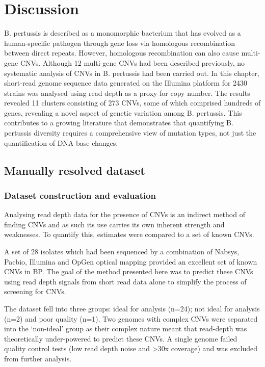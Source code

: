 \documentclass{article}
\begin{document}
\section{Discussion}

B. pertussis is described as a monomorphic bacterium that has evolved as a human-specific pathogen through gene loss via homologous recombination between direct repeats. However, homologous recombination can also cause multi-gene CNVs. Although 12 multi-gene CNVs had been described previously, no systematic analysis of CNVs in B. pertussis had been carried out. In this chapter, short-read genome sequence data generated on the Illumina platform for 2430 strains was analysed using read depth as a proxy for copy number.  The results revealed 11 clusters consisting of 273 CNVs, some of which comprised hundreds of genes, revealing a novel aspect of genetic variation among B. pertussis. This contributes to a growing literature that demonstrates that quantifying B. pertussis diversity requires a comprehensive view of mutation types, not just the quantification of DNA base changes.


\subsection{Manually resolved dataset}

\subsubsection{Dataset construction and evaluation}
Analysing read depth data for the presence of CNVs is an indirect method of finding CNVs and as such its use carries its own inherent strength and weaknesses. To quantify this, estimates were compared to a set of known CNVs.

A set of 28 isolates which had been sequenced by a combination of Nabsys, Pacbio, Illumina and OpGen optical mapping provided an excellent set of known CNVs in BP. The goal of the method presented here was to predict these CNVs using read depth signals from short read data alone to simplify the process of screening for CNVs. 

The dataset fell into three groups: ideal for analysis (n=24); not ideal for analysis (n=2) and poor quality (n=1). Two genomes with complex CNVs were separated into the `non-ideal' group as their complex nature meant that read-depth was theoretically under-powered to predict these CNVs.  A single genome failed quality control tests (low read depth noise and >30x coverage) and was excluded from further analysis. 
\end{document}
